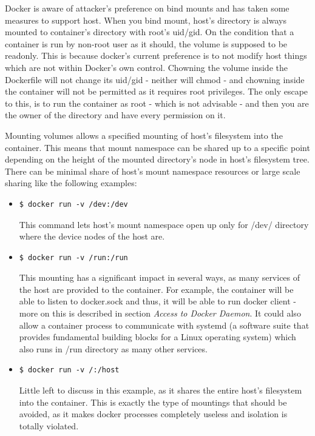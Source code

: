 Docker is aware of attacker's preference on bind mounts and has taken some measures to support host. When you bind mount, host's directory is always mounted to container's directory with root's uid/gid. On the condition that a container is run by non-root user as it should, the volume is supposed to be readonly. This is because docker's current preference is to not modify host things which are not within Docker's own control. Chowning the volume inside the Dockerfile will not change its uid/gid - neither will chmod - and chowning inside the container will not be permitted as it requires root privileges. The only escape to this, is to run the container as root - which is not advisable - and then you are the owner of the directory and have every permission on it.

Mounting volumes allows a specified mounting of host's filesystem into the container. This means that mount namespace can be shared up to a specific point depending on the height of the mounted directory's node in host's filesystem tree.
There can be minimal share of host's mount namespace resources or large scale sharing like the following examples:

\begin{itemize}
\item \begin{lstlisting}[style=dockercommands]
$ docker run -v /dev:/dev
\end{lstlisting}
This command lets host's mount namespace open up only for /dev/ directory where the device nodes of the host are.

\item \begin{lstlisting}[style=dockercommands]
$ docker run -v /run:/run
\end{lstlisting}
This mounting has a significant impact in several ways, as many services of the host are provided to the container. For example, the container will be able to listen to docker.sock and thus, it will be able to run docker client - more on this is described in section \textit{Access to Docker Daemon}. It could also allow a container process to communicate with systemd (a software suite that provides fundamental building blocks for a Linux operating system) which also runs in /run directory as many other services.

\item \begin{lstlisting}[style=dockercommands]
$ docker run -v /:/host
\end{lstlisting}
Little left to discuss in this example, as it shares the entire host's filesystem into the container. This is exactly the type of mountings that should be avoided, as it makes docker processes completely useless and isolation is totally violated.
\end{itemize}

